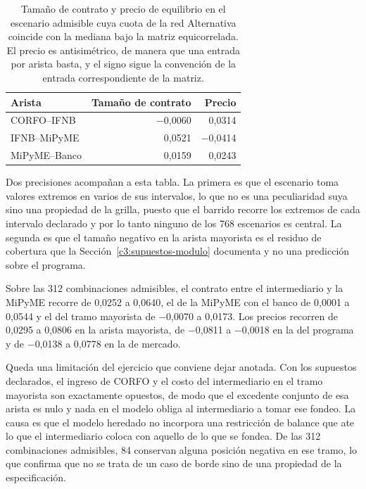 \begin{table}[H]
    \centering
    \small
    \caption[Escenario cuya cuota iguala la mediana]{Tamaño de contrato y
    precio de equilibrio en el escenario admisible cuya cuota de la red
    Alternativa coincide con la mediana bajo la matriz equicorrelada. El precio
    es antisimétrico, de manera que una entrada por arista basta, y el signo
    sigue la convención de la entrada correspondiente de la matriz.}
    \label{tab:escenario-mediano}
    \begin{tabular}{lrr}
        \toprule
        Arista & Tamaño de contrato & Precio \\
        \midrule
        CORFO--IFNB & $-$0,0060 & 0,0314 \\
        IFNB--MiPyME & 0,0521 & $-$0,0414 \\
        MiPyME--Banco & 0,0159 & 0,0243 \\
        \bottomrule
    \end{tabular}
\end{table}

Dos precisiones acompañan a esta tabla. La primera es que el escenario toma valores extremos en varios de sus intervalos, lo que no es una peculiaridad suya sino una propiedad de la grilla, puesto que el barrido recorre los extremos de cada intervalo declarado y por lo tanto ninguno de los 768 escenarios es central. La segunda es que el tamaño negativo en la arista mayorista es el residuo de cobertura que la Sección~\ref{c3:supuestos-modulo} documenta y no una predicción sobre el programa.

Sobre las 312 combinaciones admisibles, el contrato entre el intermediario y la MiPyME recorre de 0,0252 a 0,0640, el de la MiPyME con el banco de 0,0001 a 0,0544 y el del tramo mayorista de $-$0,0070 a 0,0173. Los precios recorren de 0,0295 a 0,0806 en la arista mayorista, de $-$0,0811 a $-$0,0018 en la del programa y de $-$0,0138 a 0,0778 en la de mercado.

Queda una limitación del ejercicio que conviene dejar anotada. Con los supuestos declarados, el ingreso de CORFO y el costo del intermediario en el tramo mayorista son exactamente opuestos, de modo que el excedente conjunto de esa arista es nulo y nada en el modelo obliga al intermediario a tomar ese fondeo. La causa es que el modelo heredado no incorpora una restricción de balance que ate lo que el intermediario coloca con aquello de lo que se fondea. De las 312 combinaciones admisibles, 84 conservan alguna posición negativa en ese tramo, lo que confirma que no se trata de un caso de borde sino de una propiedad de la especificación.

